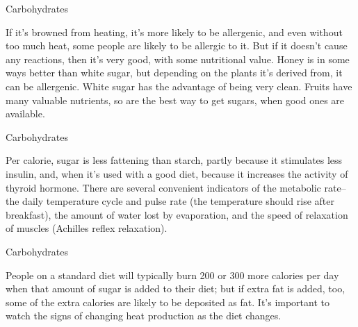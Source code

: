 \documentclass[11pt,oneside,openany,extrafontsizes]{memoir}
\begin{document}
\begin{standalonequote}{Carbohydrates}

    \begin{answer}
        If it's browned from heating, it's more likely to be allergenic, and even without too much heat, some people are likely to be allergic to it. But if it doesn't cause any reactions, then it's very good, with some nutritional value. Honey is in some ways better than white sugar, but depending on the plants it's derived from, it can be allergenic. White sugar has the advantage of being very clean. Fruits have many valuable nutrients, so are the best way to get sugars, when good ones are available.
    \end{answer}
\end{standalonequote}

\begin{standalonequote}{Carbohydrates}

    \begin{answer}
        Per calorie, sugar is less fattening than starch, partly because it stimulates less insulin, and, when it's used with a good diet, because it increases the activity of thyroid hormone. There are several convenient indicators of the metabolic rate--the daily temperature cycle and pulse rate (the temperature should rise after breakfast), the amount of water lost by evaporation, and the speed of relaxation of muscles (Achilles reflex relaxation).
    \end{answer}
\end{standalonequote}

\begin{standalonequote}{Carbohydrates}

    \begin{answer}
        People on a standard diet will typically burn 200 or 300 more calories per day when that amount of sugar is added to their diet; but if extra fat is added, too, some of the extra calories are likely to be deposited as fat. It's important to watch the signs of changing heat production as the diet changes.
    \end{answer}
\end{standalonequote}
\end{document}
